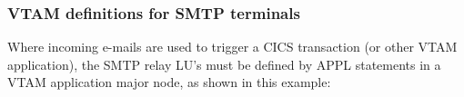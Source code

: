 \documentclass[letterpaper,10pt,english]{sphinxmanual}
\begin{document}
\subsubsection{VTAM definitions for SMTP terminals}
\label{\detokenize{connectivity_guide:vtam-definitions-for-smtp-terminals}}
\begin{sphinxVerbatim}[commandchars=\\\{\}]
  
  
  
  
\end{sphinxVerbatim}


Where incoming e-mails are used to trigger a CICS transaction (or other VTAM application), the SMTP relay LU’s must be defined by APPL statements in a VTAM application major node, as shown in this example:
\end{document}
